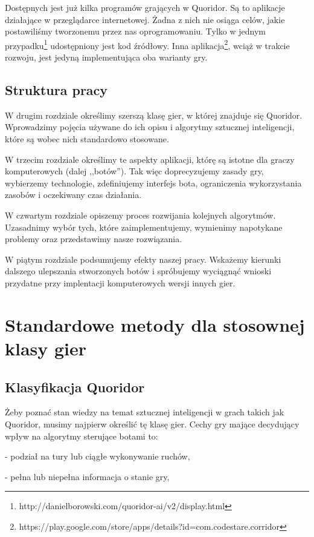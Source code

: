 \documentclass{pracamgr}
\begin{document}
Dostępnych jest już kilka programów grających w Quoridor. Są to aplikacje działające w przeglądarce internetowej. Żadna z nich nie osiąga celów, jakie postawiliśmy tworzonemu przez nas oprogramowaniu.
Tylko w jednym przypadku\footnote{http://danielborowski.com/quoridor-ai/v2/display.html} udostępniony jest kod źródłowy.
Inna aplikacja\footnote{https://play.google.com/store/apps/details?id=com.codestare.corridor}, wciąż w trakcie rozwoju, jest jedyną implementująca oba warianty gry.

\section{Struktura pracy}

W drugim rozdziale określimy szerszą klasę gier, w której znajduje się Quoridor.
Wprowadzimy pojęcia używane do ich opisu i algorytmy sztucznej inteligencji, które są wobec nich standardowo stosowane.

W trzecim rozdziale określimy te aspekty aplikacji, którę są istotne dla graczy komputerowych (dalej ,,botów'').
Tak więc doprecyzujemy zasady gry, wybierzemy technologie, zdefiniujemy interfejs bota, ograniczenia wykorzystania zasobów i oczekiwany czas działania.

W czwartym rozdziale opiszemy proces rozwijania kolejnych algorytmów.
Uzasadnimy wybór tych, które zaimplementujemy, wymienimy napotykane problemy oraz przedstawimy nasze rozwiązania.

W piątym rozdziale podsumujemy efekty naszej pracy.
Wskażemy kierunki dalszego ulepszania stworzonych botów i spróbujemy wyciągnąć wnioski przydatne przy implentacji komputerowych wersji innych gier.

\chapter{Standardowe metody dla stosownej klasy gier}

\section{Klasyfikacja Quoridor}

Żeby poznać stan wiedzy na temat sztucznej inteligencji w grach takich jak Quoridor, musimy najpierw określić tę klasę gier.
Cechy gry mające decydujący wpływ na algorytmy sterujące botami to:

 - podział na tury lub ciągłe wykonywanie ruchów,

 - pełna lub niepełna informacja o stanie gry,
\end{document}
